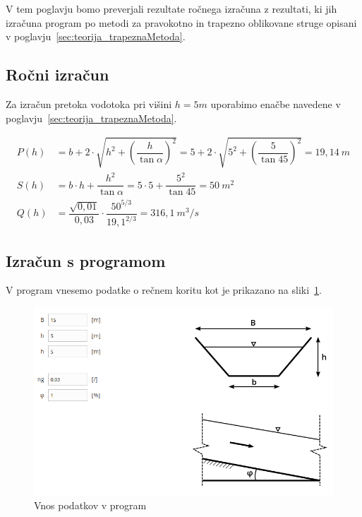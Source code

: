 V tem poglavju bomo preverjali rezultate ročnega izračuna z rezultati, ki jih izračuna program po metodi za pravokotno in trapezno oblikovane struge opisani v poglavju~\ref{sec:teorija_trapeznaMetoda}.


\subsection{Ročni izračun}
Za izračun pretoka vodotoka pri višini $h=5m$ uporabimo enačbe navedene v poglavju~\ref{sec:teorija_trapeznaMetoda}.
\begin{ceqn}
	\begin{align}
	P(h)&= b + 2 \cdot \sqrt{h^2 + \left(\dfrac{h} {\tan\alpha} \right)^{2}} = 5 + 2 \cdot \sqrt{5^2 + \left(\dfrac{5} {\tan 45} \right)^{2}} = 19,14~m \\
	S(h)&= b \cdot h +  \dfrac{h^{2}}{\tan{\alpha}}   = 5 \cdot 5 +  \dfrac{5^{2}}{\tan{45}}= 50~m^2 \\
	Q(h)&= \dfrac{\sqrt{0,01}}{0,03} \cdot \dfrac{50^{5/3}}{19,1^{2/3}} = 316,1~m^3/s
	\end{align}
\end{ceqn}


\subsection{Izračun s programom}
V program vnesemo podatke o rečnem koritu kot je prikazano na sliki~\ref{fig:trapeznaMetoda_vnosPodatkov}.

\begin{figure}[ht!]
	\begin{centering}
		\includegraphics[width=\textwidth]{slike/izracuni/trapeznaStruga.png}		
		\caption{Vnos podatkov v program}\label{fig:trapeznaMetoda_vnosPodatkov}
	\end{centering}
\end{figure}


